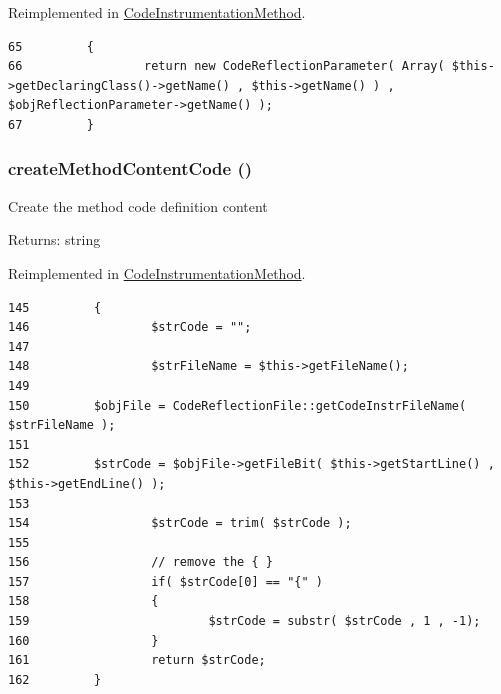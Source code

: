 Reimplemented in \hyperlink{class_code_instrumentation_method_98ceb248f2b535a3a83ac2e7990e0c1f}{CodeInstrumentationMethod}.

\begin{Code}\begin{verbatim}65         {
66                 return new CodeReflectionParameter( Array( $this->getDeclaringClass()->getName() , $this->getName() ) , $objReflectionParameter->getName() );
67         }
\end{verbatim}
\end{Code}


\hypertarget{class_code_reflection_method_e38c2891dc093dabb6b363a4de9ac495}{
\subsubsection[{createMethodContentCode}]{\setlength{\rightskip}{0pt plus 5cm}createMethodContentCode ()}}
\label{class_code_reflection_method_e38c2891dc093dabb6b363a4de9ac495}


Create the method code definition content

\begin{Desc}
\item[Returns:]string \end{Desc}


Reimplemented in \hyperlink{class_code_instrumentation_method_e38c2891dc093dabb6b363a4de9ac495}{CodeInstrumentationMethod}.

\begin{Code}\begin{verbatim}145         {
146                 $strCode = "";
147 
148                 $strFileName = $this->getFileName();
149 
150         $objFile = CodeReflectionFile::getCodeInstrFileName( $strFileName );
151 
152         $strCode = $objFile->getFileBit( $this->getStartLine() ,  $this->getEndLine() );
153 
154                 $strCode = trim( $strCode );
155 
156                 // remove the { }
157                 if( $strCode[0] == "{" )
158                 {
159                         $strCode = substr( $strCode , 1 , -1);
160                 }
161                 return $strCode;
162         }
\end{verbatim}
\end{Code}


